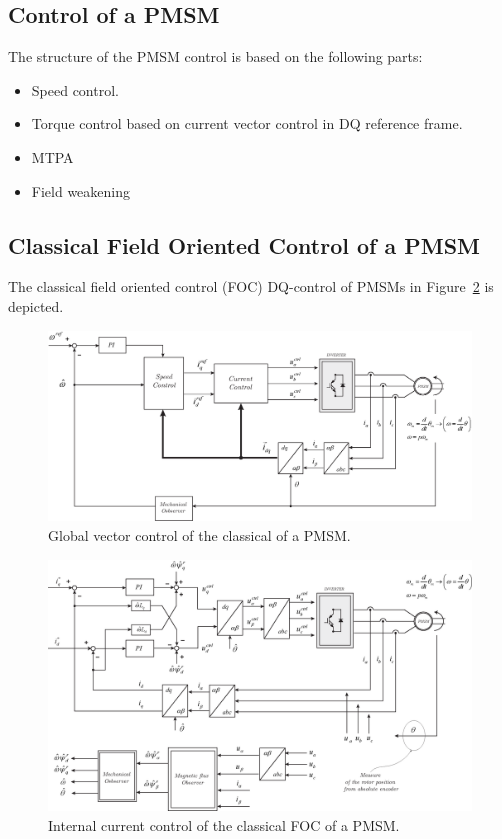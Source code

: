 \documentclass[11pt,a4paper]{article}
\numberwithin{equation}{section}
\theoremstyle{it}
\theoremstyle{definition}
\begin{document}
\begin{onehalfspace}
\section{Control of a PMSM}
The structure of the PMSM control is based on the following parts:
\begin{itemize}
	\item Speed control.
	\item Torque control based on current vector control in DQ reference frame.
	\item MTPA
	\item Field weakening
\end{itemize}

\subsection{Classical Field Oriented Control of a PMSM}
The classical field oriented control (FOC) DQ-control of PMSMs in Figure~\ref{pmsm_class_ctrl_1} is depicted.
\begin{figure}[H]
	\centering
	\includegraphics[width = 400pt, keepaspectratio]{figures/pmsm/pmsm_foc_ctrl_scheme_1.eps}
	\captionsetup{width=0.5\textwidth, font=small}
	\caption{Global vector control of the classical of a PMSM.}
	\label{pmsm_foc_ctrl_scheme_1}
\end{figure}
\begin{figure}[H]
	\centering
	\includegraphics[width = 500pt, keepaspectratio]{figures/pmsm/pmsm_classical_ctrl_2.eps}
	\captionsetup{width=0.5\textwidth, font=small}
	\caption{Internal current control of the classical FOC of a PMSM.}
	\label{pmsm_class_ctrl_1}
\end{figure}



\end{onehalfspace}
\end{document}
